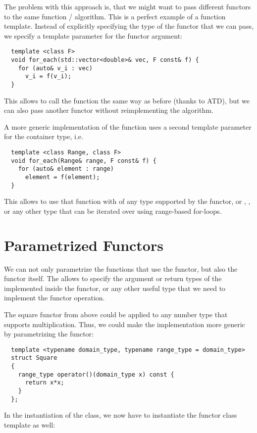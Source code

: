 The problem with this approach is, that we might want to pass different functors to the same function / algorithm. This is a perfect example
of a function template. Instead of explicitly specifying the type of the functor that we can pass, we specify a template parameter for the functor
argument:
\begin{verbatim}
  template <class F>
  void for_each(std::vector<double>& vec, F const& f) {
    for (auto& v_i : vec)
      v_i = f(v_i);
  }
\end{verbatim}

This allows to call the function  the same way as before (thanks to ATD), but we can also pass another functor without reimplementing the
algorithm.

\begin{rem}
  A more generic implementation of the  function uses a second template parameter for the container type, i.e.
  \begin{verbatim}
  template <class Range, class F>
  void for_each(Range& range, F const& f) {
    for (auto& element : range)
      element = f(element);
  }
  \end{verbatim}
  This allows to use that function with  of any type supported by the functor, or , , or
  any other type that can be iterated over using range-based for-loops.
\end{rem}


\section{Parametrized Functors}
We can not only parametrize the functions that use the functor, but also the functor itself. The allows to specify the argument or return types
of the  implemented inside the functor, or any other useful type that we need to implement the functor operation.

\begin{example}
  The square functor from above could be applied to any number type that supports multiplication. Thus, we could make the implementation more
  generic by parametrizing the functor:

  \begin{verbatim}
  template <typename domain_type, typename range_type = domain_type>
  struct Square
  {
    range_type operator()(domain_type x) const {
      return x*x;
    }
  };
  \end{verbatim}

  In the instantiation of the class, we now have to instantiate the functor class template as well:
\end{example}

